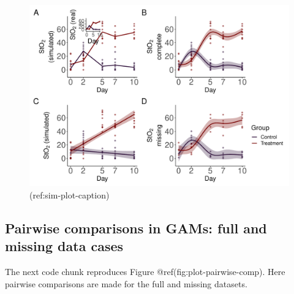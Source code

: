 \documentclass[Royal,times,sagev]{sagej}
\begin{document}
\begin{figure}

{\centering \includegraphics[width=0.75\linewidth]{Full_document_SAGE_files/figure-latex/sim-smooth-plot-Appendix-1} 

}

\caption{(ref:sim-plot-caption)}\label{fig:sim-smooth-plot-Appendix}
\end{figure}

\hypertarget{pairwise-comparisons-in-gams-full-and-missing-data-cases}{%
\subsection{Pairwise comparisons in GAMs: full and missing data
cases}\label{pairwise-comparisons-in-gams-full-and-missing-data-cases}}

The next code chunk reproduces Figure @ref(fig:plot-pairwise-comp). Here
pairwise comparisons are made for the full and missing datasets.
\end{document}
